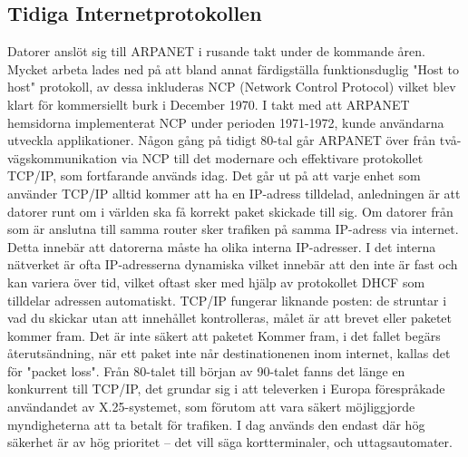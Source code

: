 \documentclass[a4paper,11pt]{article}
\begin{document}
\subsection{Tidiga Internetprotokollen}
Datorer anslöt sig till ARPANET i rusande takt under de kommande åren.
Mycket arbeta lades ned på att bland annat färdigställa funktionsduglig "Host to
host" protokoll, av dessa inkluderas NCP (Network Control Protocol) vilket blev
klart för kommersiellt burk i December 1970. I takt med att ARPANET hemsidorna
implementerat NCP under perioden 1971-1972, kunde användarna utveckla applikationer.
Någon gång på tidigt 80-tal går ARPANET över från två-vägs\-kommunikation via NCP till
det modernare och effektivare protokollet TCP/IP, som fortfarande används idag. Det
går ut på att varje enhet som använder TCP/IP alltid kommer att ha en IP-adress
tilldelad, anledningen är att datorer runt om i världen ska få korrekt paket
skickade till sig. Om datorer från som är anslutna till samma router sker trafiken
på samma IP-adress via internet. Detta innebär att datorerna måste ha olika interna
IP-adresser. I det interna nätverket är ofta IP-adresserna dynamiska vilket innebär
att den inte är fast och kan variera över tid, vilket oftast sker med hjälp av
protokollet DHCF som tilldelar adressen automatiskt. TCP/IP fungerar liknande
posten: de struntar i vad du skickar utan att innehållet kontrolleras, målet är att
brevet eller paketet kommer fram. Det är inte säkert att paketet Kommer fram, i det
fallet begärs återutsändning, när ett paket inte når destinationenen inom internet,
kallas det för "packet loss". Från 80-talet  till början av 90-talet fanns det länge
en konkurrent till TCP/IP, det grundar sig i att televerken i Europa förespråkade
användandet av X.25-systemet, som förutom att vara säkert möjliggjorde myndigheterna
att ta betalt för trafiken. I dag används den endast där hög säkerhet är av hög
prioritet -- det vill säga kortterminaler, och uttagsautomater.
\end{document}
